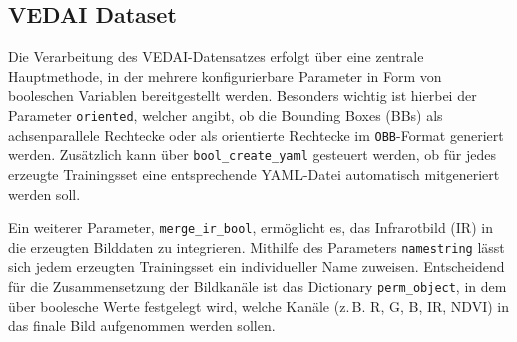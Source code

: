 \subsection{VEDAI Dataset}


Die Verarbeitung des VEDAI-Datensatzes erfolgt über eine zentrale Hauptmethode, in der mehrere konfigurierbare Parameter in Form von booleschen Variablen bereitgestellt werden. Besonders wichtig ist hierbei der Parameter \texttt{oriented}, welcher angibt, ob die Bounding Boxes (BBs) als achsenparallele Rechtecke oder als orientierte Rechtecke im \texttt{OBB}-Format generiert werden. Zusätzlich kann über \texttt{bool\_create\_yaml} gesteuert werden, ob für jedes erzeugte Trainingsset eine entsprechende YAML-Datei automatisch mitgeneriert werden soll.

Ein weiterer Parameter, \texttt{merge\_ir\_bool}, ermöglicht es, das Infrarotbild (IR) in die erzeugten Bilddaten zu integrieren. Mithilfe des Parameters \texttt{namestring} lässt sich jedem erzeugten Trainingsset ein individueller Name zuweisen. Entscheidend für die Zusammensetzung der Bildkanäle ist das Dictionary \texttt{perm\_object}, in dem über boolesche Werte festgelegt wird, welche Kanäle (z.\,B. R, G, B, IR, NDVI) in das finale Bild aufgenommen werden sollen.


